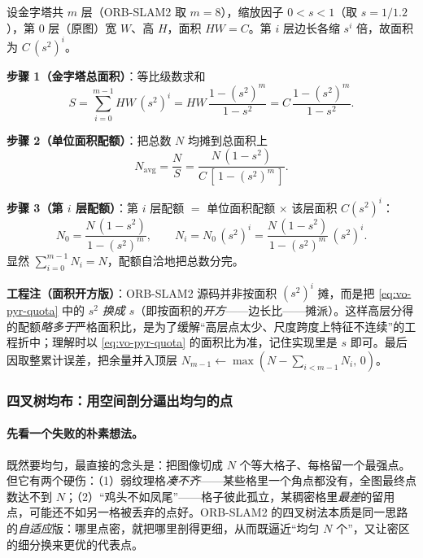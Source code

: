 \begin{derivation}[金字塔各层特征配额公式]
\label{def:vo-quota}
设金字塔共 $m$ 层（ORB-SLAM2 取 $m=8$），缩放因子 $0<s<1$（取 $s=1/1.2$），第 $0$ 层（原图）宽 $W$、高 $H$，面积 $HW=C$。第 $i$ 层边长各缩 $s^i$ 倍，故面积为 $C\,(s^2)^i$。

\textbf{步骤 1（金字塔总面积）}：等比级数求和
\begin{equation}
  S=\sum_{i=0}^{m-1} HW\,(s^2)^i
   =HW\,\frac{1-(s^2)^m}{1-s^2}
   =C\,\frac{1-(s^2)^m}{1-s^2}.
  \label{eq:vo-pyr-area}
\end{equation}

\textbf{步骤 2（单位面积配额）}：把总数 $N$ 均摊到总面积上
\begin{equation}
  N_{\mathrm{avg}}=\frac{N}{S}=\frac{N\,(1-s^2)}{C\,[\,1-(s^2)^m\,]}.
  \label{eq:vo-pyr-avg}
\end{equation}

\textbf{步骤 3（第 $i$ 层配额）}：第 $i$ 层配额 $=$ 单位面积配额 $\times$ 该层面积 $C(s^2)^i$：
\begin{equation}
  N_0=\frac{N\,(1-s^2)}{1-(s^2)^m},\qquad
  N_i=N_0\,(s^2)^i=\frac{N\,(1-s^2)}{1-(s^2)^m}\,(s^2)^i.
  \label{eq:vo-pyr-quota}
\end{equation}
显然 $\sum_{i=0}^{m-1}N_i=N$，配额自洽地把总数分完。

\textbf{工程注（面积开方版）}：ORB-SLAM2 源码并非按面积 $(s^2)^i$ 摊，而是把 \cref{eq:vo-pyr-quota} 中的 $s^2$ \emph{换成 $s$}（即按面积的\emph{开方}——边长比——摊派）。这样高层分得的配额\emph{略多于}严格面积比，是为了缓解“高层点太少、尺度跨度上特征不连续”的工程折中；理解时以 \cref{eq:vo-pyr-quota} 的面积比为准，记住实现里是 $s$ 即可。最后因取整累计误差，把余量并入顶层 $N_{m-1}\leftarrow\max(N-\sum_{i<m-1}N_i,\,0)$。
\end{derivation}

\subsubsection*{四叉树均布：用空间剖分逼出均匀的点}
\paragraph{先看一个失败的朴素想法。}既然要均匀，最直接的念头是：把图像切成 $N$ 个等大格子、每格留一个最强点。但它有两个硬伤\cite{murartal2017orbslam2}：（1）弱纹理格\emph{凑不齐}——某些格里一个角点都没有，全图最终点数达不到 $N$；（2）“鸡头不如凤尾”——格子彼此孤立，某稠密格里\emph{最差}的留用点，可能还不如另一格被丢弃的点好。ORB-SLAM2 的四叉树法本质是同一思路的\emph{自适应}版：哪里点密，就把哪里剖得更细，从而既逼近“均匀 $N$ 个”，又让密区的细分换来更优的代表点。

